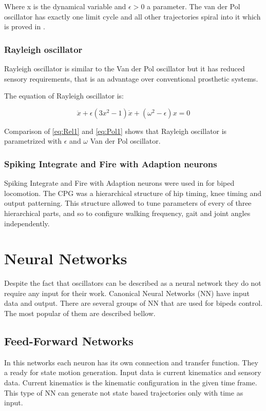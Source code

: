 \documentclass[12pt,a4paper]{report}
\begin{document}
				Where x is the dynamical variable and $\epsilon > 0$ a parameter.
				The van der Pol oscillator has exactly one limit cycle and all other trajectories spiral into it which is proved in \cite{kanamaru2007van}.
			\subsubsection{Rayleigh oscillator}
				Rayleigh oscillator is similar to the Van der Pol oscillator but it has reduced sensory requirements, that is an advantage over conventional prosthetic systems.
				
				The equation of Rayleigh oscillator is:
				
				\begin{equation}\label{eq:Rel1}
					\ddot{x} + \epsilon(3x^2 - 1)\dot{x} + (\omega^2 - \epsilon)x = 0
				\end{equation}
				
				Comparison of \ref{eq:Rel1} and \ref{eq:Pol1} shows that Rayleigh oscillator is parametrized with $\epsilon$ and $\omega$ Van der Pol oscillator.
			\subsubsection{Spiking Integrate and Fire with Adaption neurons}
				Spiking Integrate and Fire with Adaption neurons were used in \cite{russell2007configuring} for biped locomotion. The CPG was a hierarchical structure of hip timing, knee timing and output patterning. This structure allowed to tune parameters of every of three hierarchical parts, and so to configure walking frequency, gait and joint angles independently.
		\section{Neural Networks}
		Despite the fact that oscillators can be described as a neural network they do not require any input for their work. Canonical Neural Networks (NN) have input data and output. There are several groups of NN that are used for bipeds control. The most popular of them are described bellow.

			\subsection{Feed-Forward Networks}
				In this networks each neuron has its own connection and transfer function. They a ready for state motion generation.  Input data is current kinematics and sensory data. Current kinematics is the kinematic configuration in the given time frame. This type of NN can generate not state based trajectories only with time as input. 
\end{document}
